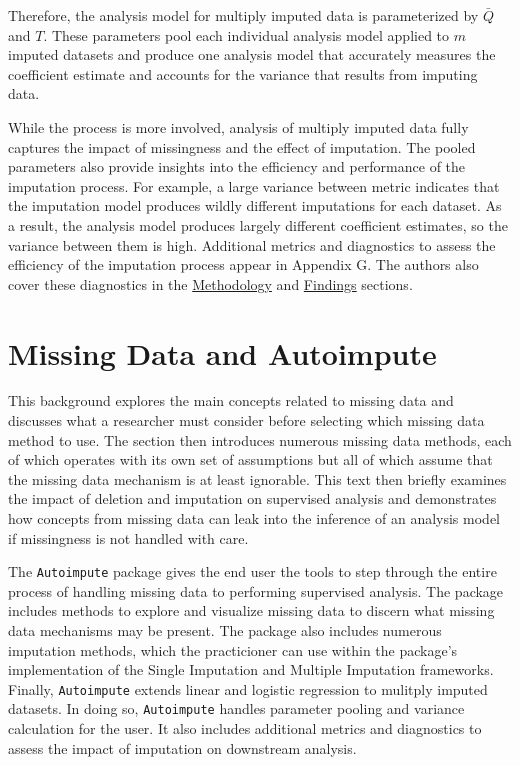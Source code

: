 \documentclass[12pt,oneside]{chicagocapstone}
\begin{document}
Therefore, the analysis model for multiply imputed data is parameterized
by \(\bar Q\) and \(T\). These parameters pool each individual analysis
model applied to \(m\) imputed datasets and produce one analysis model
that accurately measures the coefficient estimate and accounts for the
variance that results from imputing data.

While the process is more involved, analysis of multiply imputed data
fully captures the impact of missingness and the effect of imputation.
The pooled parameters also provide insights into the efficiency and
performance of the imputation process. For example, a large variance
between metric indicates that the imputation model produces wildly
different imputations for each dataset. As a result, the analysis model
produces largely different coefficient estimates, so the variance
between them is high. Additional metrics and diagnostics to assess the
efficiency of the imputation process appear in Appendix G. The authors
also cover these diagnostics in the
\protect\hyperlink{methodology}{Methodology} and
\protect\hyperlink{findings}{Findings} sections.

\section*{Missing Data and
Autoimpute}\label{background-missing-data-autoimpute}

This background explores the main concepts related to missing data and
discusses what a researcher must consider before selecting which missing
data method to use. The section then introduces numerous missing data
methods, each of which operates with its own set of assumptions but all
of which assume that the missing data mechanism is at least ignorable.
This text then briefly examines the impact of deletion and imputation on
supervised analysis and demonstrates how concepts from missing data can
leak into the inference of an analysis model if missingness is not
handled with care.

The \texttt{Autoimpute} package gives the end user the tools to step
through the entire process of handling missing data to performing
supervised analysis. The package includes methods to explore and
visualize missing data to discern what missing data mechanisms may be
present. The package also includes numerous imputation methods, which
the practicioner can use within the package's implementation of the
Single Imputation and Multiple Imputation frameworks. Finally,
\texttt{Autoimpute} extends linear and logistic regression to mulitply
imputed datasets. In doing so, \texttt{Autoimpute} handles parameter
pooling and variance calculation for the user. It also includes
additional metrics and diagnostics to assess the impact of imputation on
downstream analysis.
\end{document}
